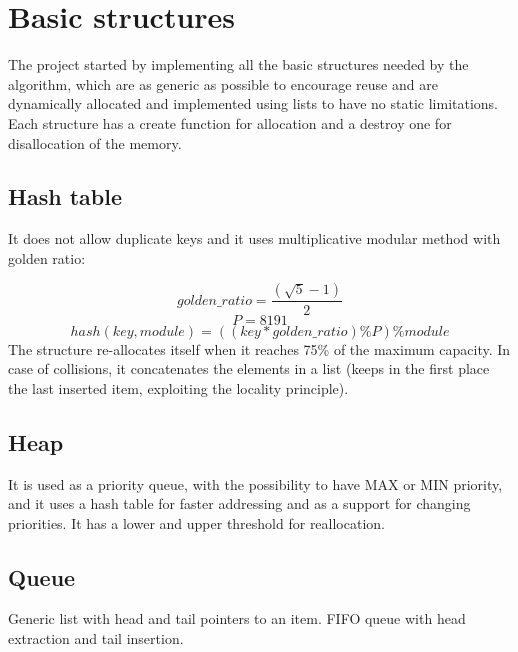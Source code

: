 \section{Basic structures}
\label{Sec:basic_structures}

The project started by implementing all the basic structures needed by the algorithm, which are as generic as possible to encourage reuse and are dynamically allocated and implemented using lists to have no static limitations.
\\
Each structure has a create function for allocation and a destroy one for disallocation of the memory.

\subsection{Hash table}
\label{hash_table}

It does not allow duplicate keys and it uses multiplicative modular method with golden ratio:

\begin{equation}
    golden\_ratio = \frac{(\sqrt{5} - 1)}{2}
\end{equation}
\begin{equation}
    P = 8191
\end{equation}
\begin{equation}
    hash(key, module) = ((key*golden\_ratio)\%P)\%module
\end{equation}
The structure re-allocates itself when it reaches 75\% of the maximum capacity. In case of collisions, it concatenates the elements in a list (keeps in the first place the last inserted item, exploiting the locality principle).



\subsection{Heap}
\label{heap}

It is used as a priority queue, with the possibility to have MAX or MIN priority, and it uses a hash table for faster addressing and as a support for changing priorities.
It has a lower and upper threshold for reallocation.


\subsection{Queue}

Generic list with head and tail pointers to an item. FIFO queue with head extraction and tail insertion.

